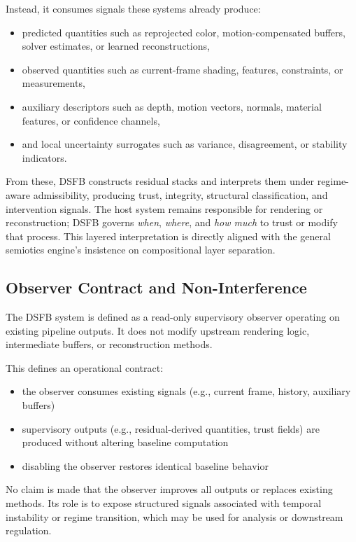 \documentclass[11pt,letterpaper]{article}
\theoremstyle{gcresult}
\theoremstyle{definition}
\begin{document}
Instead, it consumes signals these systems already produce:
\begin{itemize}[leftmargin=1.5em]
    \item predicted quantities such as reprojected color, motion-compensated buffers, solver estimates, or learned reconstructions,
    \item observed quantities such as current-frame shading, features, constraints, or measurements,
    \item auxiliary descriptors such as depth, motion vectors, normals, material features, or confidence channels,
    \item and local uncertainty surrogates such as variance, disagreement, or stability indicators.
\end{itemize}

From these, DSFB constructs residual stacks and interprets them under regime-aware admissibility, producing trust, integrity, structural classification, and intervention signals. The host system remains responsible for rendering or reconstruction; DSFB governs \emph{when}, \emph{where}, and \emph{how much} to trust or modify that process. This layered interpretation is directly aligned with the general semiotics engine’s insistence on compositional layer separation. 



\subsection{Observer Contract and Non-Interference}

The DSFB system is defined as a read-only supervisory observer operating on existing pipeline outputs. It does not modify upstream rendering logic, intermediate buffers, or reconstruction methods.

This defines an operational contract:
\begin{itemize}
    \item the observer consumes existing signals (e.g., current frame, history, auxiliary buffers)
    \item supervisory outputs (e.g., residual-derived quantities, trust fields) are produced without altering baseline computation
    \item disabling the observer restores identical baseline behavior
\end{itemize}

No claim is made that the observer improves all outputs or replaces existing methods. Its role is to expose structured signals associated with temporal instability or regime transition, which may be used for analysis or downstream regulation.
\end{document}

